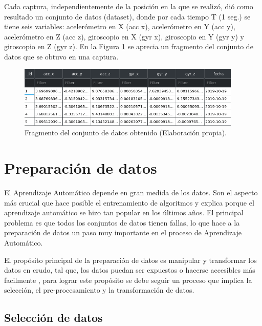 Cada captura, independientemente de la posici\'{o}n en la que se realiz\'{o}, di\'{o} como resultado un conjunto de datos (dataset), donde por cada tiempo T (1 seg.) se tiene seis variables: aceler\'{o}metro en X (acc x), aceler\'{o}metro en Y (acc y), aceler\'{o}metro en Z (acc z), giroscopio en X (gyr x), giroscopio en Y (gyr y) y giroscopio en Z (gyr z). En la Figura \ref{fig:dataset} se aprecia un fragmento del conjunto de datos que se obtuvo en una captura.

\begin{figure}[h!]
  \begin{center}	\includegraphics[width=0.95\textwidth,frame]{imagenes/Cap3/dataset}
  \caption{Fragmento del conjunto de datos obtenido (Elaboraci\'{o}n propia).}
  \label{fig:dataset}
  \end{center}
\end{figure}

\section{Preparaci\'{o}n de datos}

El Aprendizaje Autom\'{a}tico depende en gran medida de los datos. Son el aspecto m\'{a}s crucial que hace posible el entrenamiento de algoritmos y explica porque el aprendizaje autom\'{a}tico se hizo tan popular en los \'{u}ltimos a\~{n}os. El principal problema es que todos los conjuntos de datos tienen fallas, lo que hace a la preparaci\'{o}n de datos un paso muy importante en el proceso de Aprendizaje Autom\'{a}tico.

\vspace{5mm} %

El prop\'{o}sito principal de la preparaci\'{o}n de datos es manipular y transformar los datos en crudo, tal que, los datos puedan ser expuestos o hacerse accesibles m\'{a}s facilmente \cite{Reference37}, para lograr este prop\'{o}sito se debe seguir un proceso que implica la selecci\'{o}n, el pre-procesamiento y la transformaci\'{o}n de datos.
 
\subsection{Selecci\'{o}n de datos}

